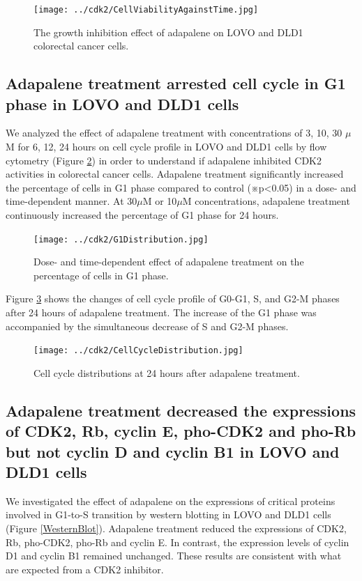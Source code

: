 \documentclass[10pt]{article}
\begin{document}
\begin{figure}
\centering
\texttt{[image: ../cdk2/CellViabilityAgainstTime.jpg]}
\caption{The growth inhibition effect of adapalene on LOVO and DLD1 colorectal cancer cells.}
\label{CellViabilityAgainstTime}
\end{figure}

\subsection*{Adapalene treatment arrested cell cycle in G1 phase in LOVO and DLD1 cells}

We analyzed the effect of adapalene treatment with concentrations of 3, 10, 30 $\mu$M for 6, 12, 24 hours on cell cycle profile in LOVO and DLD1 cells by flow cytometry (Figure \ref{G1Distribution}) in order to understand if adapalene inhibited CDK2 activities in colorectal cancer cells. Adapalene treatment significantly increased the percentage of cells in G1 phase compared to control (※p<0.05) in a dose- and time-dependent manner. At 30$\mu$M or 10$\mu$M concentrations, adapalene treatment continuously increased the percentage of G1 phase for 24 hours.

\begin{figure}
\centering
\texttt{[image: ../cdk2/G1Distribution.jpg]}
\caption{Dose- and time-dependent effect of adapalene treatment on the percentage of cells in G1 phase.}
\label{G1Distribution}
\end{figure}

Figure \ref{CellCycleDistribution} shows the changes of cell cycle profile of G0-G1, S, and G2-M phases after 24 hours of adapalene treatment. The increase of the G1 phase was accompanied by the simultaneous decrease of S and G2-M phases.

\begin{figure}
\centering
\texttt{[image: ../cdk2/CellCycleDistribution.jpg]}
\caption{Cell cycle distributions at 24 hours after adapalene treatment.}
\label{CellCycleDistribution}
\end{figure}

\subsection*{Adapalene treatment decreased the expressions of CDK2, Rb, cyclin E, pho-CDK2 and pho-Rb but not cyclin D and cyclin B1 in LOVO and DLD1 cells}

We investigated the effect of adapalene on the expressions of critical proteins involved in G1-to-S transition by western blotting in LOVO and DLD1 cells (Figure \ref{WesternBlot}). Adapalene treatment reduced the expressions of CDK2, Rb, pho-CDK2, pho-Rb and cyclin E. In contrast, the expression levels of cyclin D1 and cyclin B1 remained unchanged. These results are consistent with what are expected from a CDK2 inhibitor.
\end{document}
